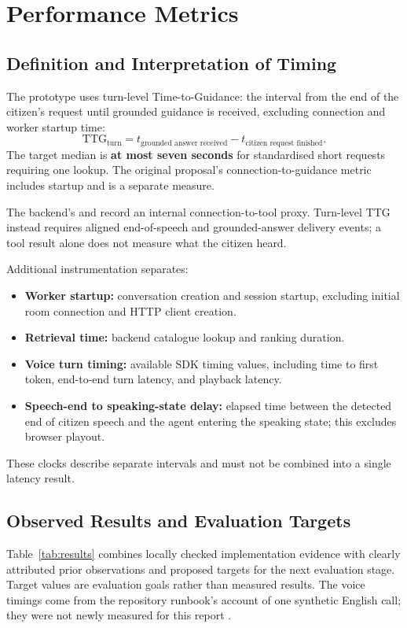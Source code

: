 \documentclass[11pt,a4paper,oneside]{report}
\newcommand{\code}[1]{\texttt{\detokenize{#1}}}
\begin{document}
\section{Performance Metrics}

\subsection{Definition and Interpretation of Timing}
The prototype uses turn-level Time-to-Guidance: the interval from the end of
the citizen's request until grounded guidance is received, excluding connection
and worker startup time:
\[
  \mathrm{TTG}_{\text{turn}} = t_{\text{grounded answer received}}
                 - t_{\text{citizen request finished}}.
\]
The target median is \textbf{at most seven seconds} for standardised short
requests requiring one lookup. The original proposal's connection-to-guidance
metric includes startup and is a separate measure.

The backend's \code{connected_at} and \code{first_guidance_at} record an internal
connection-to-tool proxy. Turn-level TTG instead requires aligned end-of-speech
and grounded-answer delivery events; a tool result alone does not measure what
the citizen heard.

Additional instrumentation separates:
\begin{itemize}
  \item \textbf{Worker startup:} conversation creation and session startup,
    excluding initial room connection and HTTP client creation.
  \item \textbf{Retrieval time:} backend catalogue lookup and ranking duration.
  \item \textbf{Voice turn timing:} available SDK timing values, including
    time to first token, end-to-end turn latency, and playback latency.
  \item \textbf{Speech-end to speaking-state delay:} elapsed time between the
    detected end of citizen speech and the agent entering the speaking state;
    this excludes browser playout.
\end{itemize}

These clocks describe separate intervals and must not be combined into a single
latency result.

\subsection{Observed Results and Evaluation Targets}
Table~\ref{tab:results} combines locally checked implementation evidence with
clearly attributed prior observations and proposed targets for the next evaluation
stage. Target values are evaluation goals rather than measured results.
The voice timings come from the repository
runbook's account of one synthetic English call; they were not newly measured for
this report \cite{runbook}.
\end{document}
